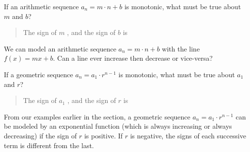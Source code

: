 \documentclass{ximera}
\begin{document}
\begin{question}
  If an arithmetic sequence $a_n = m\cdot n + b$ is monotonic, what
  must be true about $m$ and $b$?
  \begin{prompt}
    \begin{quote}
      The sign of $m$ , and the sign of $b$ is
    \end{quote}
  \end{prompt}
  \begin{feedback}
   We can model an arithmetic sequence $a_n = m\cdot n + b$ with the line $f(x) = mx+b$.  Can a line ever increase then decrease or vice-versa? 
  \end{feedback}
\end{question}

\begin{question}
  If a geometric sequence $a_n = a_1 \cdot r^{n-1}$ is monotonic, what
  must be true about $a_1$ and $r$?
  \begin{prompt}
    \begin{quote}
      The sign of $a_1$ , and the sign of
      $r$ is 
    \end{quote}
  \end{prompt}
    \begin{feedback}
    From our examples earlier in the section, a geometric sequence $a_n = a_1 \cdot r^{n-1}$ can be modeled by an exponential function (which is always increasing or always decreasing) if the sign of $r$ is positive.  If $r$ is negative, the signs of each successive term is different from the last.
  \end{feedback}
\end{question}
\end{document}
